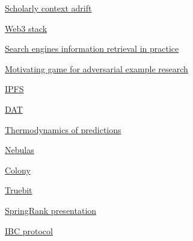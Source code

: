 \documentclass[10pt,oneside]{amsart}
\newcommand{\linkred}[2]{\href{#1}{\color{red}{#2}}}
\begin{document}
\begin{enumerate}[{[1] }]
\item \linkred{https://github.com/cybercongress/cyberd}{cyberd}
\item \href{https://ipfs.io/ipfs/QmNhaUrhM7KcWzFYdBeyskoNyihrpHvUEBQnaddwPZigcN}{Scholarly context adrift}
\item \href{https://ipfs.io/ipfs/Qmf3eHU9idMUZgx6MKhCsFPWL24X9pDUi2ECqyH8UtBAMQ}{Web3 stack}
\item \href{https://ipfs.io/ipfs/QmeS4LjoL1iMNRGuyYSx78RAtubTT2bioSGnsvoaupcHR6}{Search engines information retrieval in practice}
\item \href{https://ipfs.io/ipfs/QmNrAFz34SLqkzhSg4wAYYJeokfJU5hBEpkT4hPRi226y9.ifps}{Motivating game for adversarial example research}
\item \linkred{https://steemit.com/web3/@hipster/an-idea-of-decentralized-search-for-web3-ce860d61defe5est}{An idea of decentralized search}
\item \href{https://ipfs.io/ipfs/QmV9tSDx9UiPeWExXEeH6aoDvmihvx6jD5eLb4jbTaKGps}{IPFS}
\item \href{https://ipfs.io/ipfs/QmXHGmfo4sjdHVW2MAxczAfs44RCpSeva2an4QvkzqYgfR}{DAT}
\item \linkred{https://github.com/cosmos/cosmos-sdk}{cosmos-sdk}
\item \linkred{https://github.com/multiformats/cid#cidv0}{CIDv0}
\item \href{https://ipfs.io/ipfs/QmP81EcuNDZHQutvdcDjbQEqiTYUzU315aYaTyrVj6gtJb}{Thermodynamics of predictions}
\item \linkred{https://github.com/cybercongress/cyb/blob/dev/docs/dura.md}{DURA}
\item \href{https://ipfs.io/ipfs/QmWTZjDZNbBqcJ5b6VhWGXBQ5EQavKKDteHsdoYqB5CBjh}{Nebulas}
\item \href{https://ipfs.io/ipfs/QmZo7eY5UdJYotf3Z9GNVBGLjkCnE1j2fMdW2PgGCmvGPj}{Colony}
\item \href{https://ipfs.io/ipfs/QmTrxXp2xhB2zWGxhNoLgsztevqKLwpy5HwKjLjzFa7rnD}{Truebit}
\item \href{https://ipfs.io/ipfs/QmNvxWTXQaAqjEouZQXTV4wDB5ryW4PGcaxe2Lukv1BxuM}{SpringRank presentation}
\item \linkred{http://ilpubs.stanford.edu:8090/422/1/1999-66.pdf}{PageRank}
\item \linkred{https://tools.ietf.org/html/rfc6962#section-2.1}{RFC-6962}
\item \href{https://ipfs.io/ipfs/QmdCeixQUHBjGnKfwbB1dxf4X8xnadL8xWmmEnQah5n7x2}{IBC protocol}

\end{enumerate}
\end{document}
